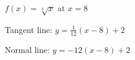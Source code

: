 {$f(x)=\sqrt[3]{x}$ at $x=8$
}
{Tangent line: $y = \frac{1}{12}(x-8) + 2$

Normal line: $y = -12(x-8)+2$
}
